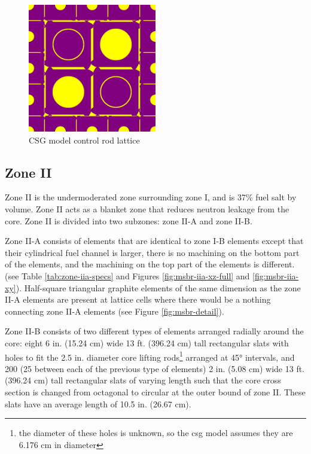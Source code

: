 \begin{figure}[htpb]
    \centering
    \includegraphics[width=0.5\textwidth]{figs/ch4/cr_xy_openmc.png}
    \caption{CSG model control rod lattice}
    \label{fig:control-rods}
\end{figure}


\subsection{Zone II}

Zone II is the undermoderated zone surrounding zone I, and is 37\% fuel salt by
volume. Zone II acts as a blanket zone that reduces neutron leakage from the
core\cite{robertson_conceptual_1971}. Zone II is divided into two subzones: zone
II-A and zone II-B.

Zone II-A consists of elements that are identical to zone I-B elements except
that their cylindrical fuel channel is larger, there is no machining on the bottom part of the elements, and the machining on the top part of the elements is different. (see Table \ref{tab:zone-iia-specs} and Figures \ref{fig:msbr-iia-xz-full} and \ref{fig:msbr-iia-xy}). Half-square triangular graphite elements of the same dimension as the zone II-A elements are present at lattice cells where there would be a nothing connecting zone II-A elements (see Figure \ref{fig:msbr-detail}). 

Zone II-B consists of two different types of elements arranged radially around the core: eight 6 in. (15.24 \unit{\centi\metre}) wide 13 ft. (396.24 \unit{\centi\metre}) tall rectangular slats with holes to fit the 2.5 in. diameter core lifting rods\footnote{the diameter of these holes is unknown, so the \Gls{csg} model assumes they are 6.176 cm in diameter} arranged at 45\unit{\degree} intervals, and 200 (25 between each of the previous type of elements) 2 in. (5.08 \unit{\centi\metre}) wide 13 ft. (396.24 \unit{\centi\metre})
tall rectangular slats of varying length such that the core cross section is
changed from octagonal to circular at the outer bound of zone
II\cite{robertson_conceptual_1971}. These slats have an average length of 10.5
in. (26.67 \unit{\centi\metre}).

